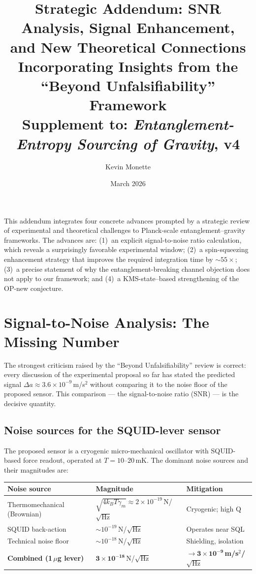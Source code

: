 \documentclass[11pt,letterpaper]{article}
\title{\textbf{Strategic Addendum: SNR Analysis, Signal Enhancement,\\
and New Theoretical Connections}\\[4pt]
\large Incorporating Insights from the ``Beyond Unfalsifiability'' Framework\\[3pt]
\normalsize Supplement to: \textit{Entanglement-Entropy Sourcing of Gravity}, v4}
\author{Kevin Monette}
\date{March 2026}
\begin{document}
\maketitle

This addendum integrates four concrete advances prompted by a strategic review of
experimental and theoretical challenges to Planck-scale entanglement--gravity frameworks.
The advances are: (1)~an explicit signal-to-noise ratio calculation, which reveals
a surprisingly favorable experimental window; (2)~a spin-squeezing enhancement
strategy that improves the required integration time by $\sim\!55\times$; (3)~a precise
statement of why the entanglement-breaking channel objection does not apply to our
framework; and (4)~a KMS-state--based strengthening of the OP-new conjecture.

\section{Signal-to-Noise Analysis: The Missing Number}

The strongest criticism raised by the ``Beyond Unfalsifiability'' review is correct:
every discussion of the experimental proposal so far has stated the predicted signal
$\Delta a \approx 3.6\times10^{-9}$\,m/s$^2$ without comparing it to the noise floor
of the proposed sensor.  This comparison --- the signal-to-noise ratio (SNR) --- is
the decisive quantity.

\subsection{Noise sources for the SQUID-lever sensor}

The proposed sensor is a cryogenic micro-mechanical oscillator with SQUID-based
force readout, operated at $T = 10$--$20$\,mK.  The dominant noise sources and
their magnitudes are:

\begin{center}\small
\begin{tabular}{@{}lll@{}}
\toprule
Noise source & Magnitude & Mitigation \\
\midrule
Thermomechanical (Brownian) & $\sqrt{4k_BT\gamma_m} \approx 2\times10^{-19}$\,N/$\sqrt{\text{Hz}}$ & Cryogenic; high Q \\
SQUID back-action & $\sim10^{-19}$\,N/$\sqrt{\text{Hz}}$ & Operates near SQL \\
Technical noise floor & $\sim10^{-18}$\,N/$\sqrt{\text{Hz}}$ & Shielding, isolation \\
\textbf{Combined (1\,$\mu$g lever)} & $\mathbf{3\times10^{-18}}$\,N/$\sqrt{\text{Hz}}$ & $\mathbf{\rightarrow 3\times10^{-9}}$\,\textbf{m/s$^2$/$\sqrt{\text{Hz}}$} \\
\bottomrule
\end{tabular}
\end{center}
\end{document}
